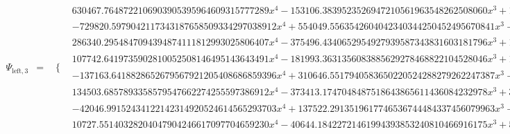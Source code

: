\documentclass{article}
\begin{document}
\begin{landscape}
\begin{eqnarray*}
\begin{array}{cc}
\end{array}\\
\Psi_{\text{left},3} & = & \begin{array}{cc}
 \{ & 
\begin{array}{cc}
 630467.7648722106903905395964609315777289 x^4-153106.3839523526947210561963548262508060 x^3+11439.42810311169176131341187913791084225 x^2-264.1836008627369420679169498445421293205 x & x\geq 0\land x<\frac{1}{8} \\
 -729820.5979042117343187658509334297038912 x^4+554049.5563542604042340344250452495670841 x^3-154371.9011889059357773598326411336129543 x^2+18667.96685445998112212197010986323236887 x-824.7790815704555305960825315134883499993 & x\geq \frac{1}{8}\land x<\frac{1}{4} \\
 286340.2954847094394874111812993025806407 x^4-375496.4340652954927939587343831603181796 x^3+182881.8448290888122864168517642704862795 x^2-39179.08878767823557990371921455773154430 x+3113.403313344514446806311108163790396977 & x\geq \frac{1}{4}\land x<\frac{3}{8} \\
 107742.6419735902810052508146495143643491 x^4-181993.3631356083885629278468822104528046 x^3+114880.1335572496279391451940448456931816 x^2-32138.97084475889692458542924926265930192 x+3363.674589185213502619763124307131329284 & x\geq \frac{3}{8}\land x<\frac{1}{2} \\
 -137163.6418828652679567921205408686859396 x^4+310646.5517940583650220524288279262247387 x^3-263514.8564158558475498256126433118014600 x^2+99229.22485932428785667163825148385232655 x-13995.02239475988240376091996839489487442 & x\geq \frac{1}{2}\land x<\frac{5}{8} \\
 134503.6857893358579547662274255597386912 x^4-373413.1747048487518643865611436084232978 x^3+388059.9044821001152652829887303409311366 x^2-178906.8589520978000839246212786551561801 x+30872.26369515525866446849523957101632296 & x\geq \frac{5}{8}\land x<\frac{3}{4} \\
 -42046.99152434122142314920524614565293703 x^4+137522.2913519617746536744484337456079963 x^3-168459.8848878847934884571178898720609949 x^2+91598.49409884187099768987762338225258097 x-18653.53157136928595065200250975168005618 & x\geq \frac{3}{4}\land x<\frac{7}{8} \\
 10727.55140328204047904246617097704659230 x^4-40644.18422721461994393853240810466916175 x^3+57687.24371566757523957096141498321529479 x^2-36352.14036281945256349619028956060947355 x+8581.529471084456788821295111705016748203 & x\geq \frac{7}{8}\land x<1
\end{array}


\end{array}
\end{eqnarray*}
\end{landscape}
\end{document}
